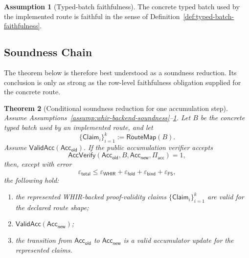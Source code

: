 \documentclass[11pt]{article}
\newtheorem{theorem}{Theorem}[section]
\theoremstyle{definition}
\newtheorem{assumption}[theorem]{Assumption}
\newcommand{\WHIR}{\mathsf{WHIR}}
\newcommand{\Acc}{\mathsf{Acc}}
\begin{document}
\begin{assumption}[Typed-batch faithfulness]
\label{assump:typed-batch-faithfulness}
The concrete typed batch used by the implemented route is faithful in the sense
of Definition~\ref{def:typed-batch-faithfulness}.
\end{assumption}

\subsection{Soundness Chain}
\label{sec:soundness-chain}

The theorem below is therefore best understood as a soundness reduction. Its
conclusion is only as strong as the row-level faithfulness obligation supplied
for the concrete route.

\begin{theorem}[Conditional soundness reduction for one accumulation step]
  \label{thm:conditional-soundness}
  Assume
  Assumptions~\ref{assump:whir-backend-soundness}--\ref{assump:typed-batch-faithfulness}.
  Let \(B\) be the concrete typed batch used by an implemented route, and let
  \[
    \{\mathsf{Claim}_i\}_{i=1}^k := \mathsf{RouteMap}(B).
  \]
  Assume \(\mathsf{ValidAcc}(\Acc_{\mathsf{old}})\). If the public accumulation
  verifier accepts
  \[
    \mathsf{AccVerify}
    \left(
      \Acc_{\mathsf{old}},
      B,
      \Acc_{\mathsf{new}},
      \Pi_{\mathsf{acc}}
    \right)=1,
  \]
  then, except with error
  \[
    \varepsilon_{\mathsf{total}}
    \leq
    \varepsilon_{\WHIR}
    +
    \varepsilon_{\mathsf{fold}}
    +
    \varepsilon_{\mathsf{bind}}
    +
    \varepsilon_{\mathsf{FS}},
  \]
  the following hold:
  \begin{enumerate}
    \item the represented WHIR-backed proof-validity claims
          \(\{\mathsf{Claim}_i\}_{i=1}^k\) are valid for the declared route shape;
    \item \(\mathsf{ValidAcc}(\Acc_{\mathsf{new}})\);
    \item the transition from \(\Acc_{\mathsf{old}}\) to \(\Acc_{\mathsf{new}}\)
          is a valid accumulator update for the represented claims.
  \end{enumerate}
  \end{theorem}
\end{document}
